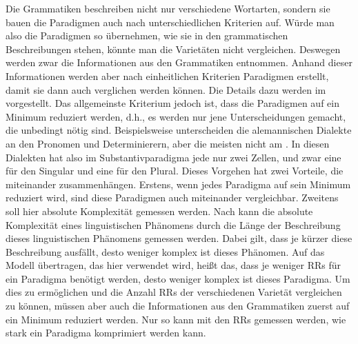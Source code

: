\begin{exe}
\begin{exe}
Die Grammatiken beschreiben nicht nur verschiedene Wortarten, sondern sie bauen die Paradigmen auch nach unterschiedlichen Kriterien auf. Würde man also die Paradigmen so übernehmen, wie sie in den grammatischen Beschreibungen stehen, könnte man die Varietäten nicht vergleichen. Deswegen werden zwar die Informationen aus den Grammatiken entnommen. Anhand dieser Informationen werden aber nach einheitlichen Kriterien Paradigmen erstellt, damit sie dann auch verglichen werden können. Die Details dazu werden im  vorgestellt. Das allgemeinste Kriterium jedoch ist, dass die Paradigmen auf ein Minimum reduziert werden, d.h., es werden nur jene Unterscheidungen gemacht, die unbedingt nötig sind. Beispielsweise unterscheiden die alemannischen Dialekte  an den Pronomen und Determinierern, aber die meisten nicht am . In diesen Dialekten hat also im Substantivparadigma jede  nur zwei Zellen, und zwar eine für den Singular und eine für den Plural. Dieses Vorgehen hat zwei Vorteile, die miteinander zusammenhängen. Erstens, wenn jedes Paradigma auf sein Minimum reduziert wird, sind diese Paradigmen auch miteinander vergleichbar. Zweitens soll hier absolute Komplexität gemessen werden. Nach \citet[24]{Miestamo2008} kann die absolute Komplexität eines linguistischen Phänomens durch die Länge der Beschreibung dieses linguistischen Phänomens gemessen werden. Dabei gilt, dass je kürzer diese Beschreibung ausfällt, desto weniger komplex ist dieses Phänomen. Auf das Modell übertragen, das hier verwendet wird, heißt das, dass je weniger RRs für ein Paradigma benötigt werden, desto weniger komplex ist dieses Paradigma. Um dies zu ermöglichen und die Anzahl RRs der verschiedenen Varietät vergleichen zu können, müssen aber auch die Informationen aus den Grammatiken zuerst auf ein Minimum reduziert werden. Nur so kann mit den RRs gemessen werden, wie stark ein Paradigma komprimiert werden kann.


\end{exe}
\end{exe}
